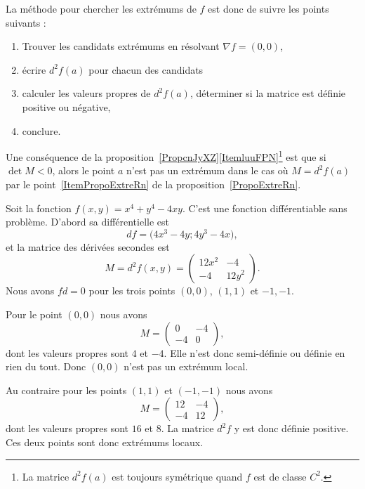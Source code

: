 La méthode pour chercher les extrémums de \( f\) est donc de suivre les points suivants :
\begin{enumerate}
    \item
        Trouver les candidats extrémums en résolvant \( \nabla f=(0,0)\),
    \item
        écrire \( d^2f(a)\) pour chacun des candidats
    \item
        calculer les valeurs propres de \( d^2f(a)\), déterminer si la matrice est définie positive ou négative,
    \item
        conclure.
\end{enumerate}

Une conséquence de la proposition~\ref{PropcnJyXZ}\ref{ItemluuFPN}\footnote{La matrice \( d^2f(a)\) est toujours symétrique quand \( f\) est de classe \( C^2\).} est que si \( \det M<0\), alors le point \( a\) n'est pas  un extrémum dans le cas où \( M=d^2f(a)\) par le point~\ref{ItemPropoExtreRn} de la proposition~\ref{PropoExtreRn}.

\begin{example}
    Soit la fonction \( f(x,y)=x^4+y^4-4xy\). C'est une fonction différentiable sans problème. D'abord sa différentielle est
    \begin{equation}
        df=\big(4x^3-4y;4y^3-4x),
    \end{equation}
    et la matrice des dérivées secondes est
    \begin{equation}
        M=d^2f(x,y)=\begin{pmatrix}
            12x^2   &   -4    \\
            -4      &   12y^2
        \end{pmatrix}.
    \end{equation}
    Nous avons \( fd=0\) pour les trois points \( (0,0)\), \( (1,1)\) et \( -1,-1\).

    Pour le point \( (0,0)\) nous avons
    \begin{equation}
        M=\begin{pmatrix}
            0     &   -4      \\
            -4    &   0
        \end{pmatrix},
    \end{equation}
    dont les valeurs propres sont \( 4\) et \( -4\). Elle n'est donc semi-définie ou définie en rien du tout. Donc \( (0,0)\) n'est pas un extrémum local.

    Au contraire pour les points \( (1,1)\) et \( (-1,-1)\) nous avons
    \begin{equation}
        M=\begin{pmatrix}
            12    &   -4      \\
            -4    &   12
        \end{pmatrix},
    \end{equation}
    dont les valeurs propres sont \( 16\) et \( 8\). La matrice \( d^2f\) y est donc définie positive. Ces deux points sont donc extrémums locaux.
\end{example}

